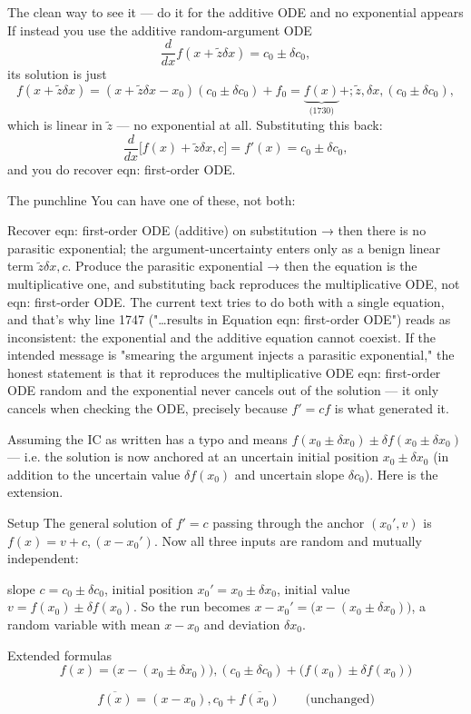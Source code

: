 \documentclass[twoside]{article}
\numberwithin{equation}{section}
\begin{document}
The clean way to see it — do it for the additive ODE and no exponential appears
If instead you use the additive random-argument ODE
$$\frac{d}{dx}f(x+\tilde z\delta x)=c_0\pm\delta c_0,$$
its solution is just
$$f(x+\tilde z\delta x)=(x+\tilde z\delta x-x_0)(c_0\pm\delta c_0)+f_0=\underbrace{f(x)}_{\text{(1730)}}+;\tilde z,\delta x,(c_0\pm\delta c_0),$$
which is linear in $\tilde z$ — no exponential at all. Substituting this back:
$$\frac{d}{dx}\big[f(x)+\tilde z\delta x,c\big]=f'(x)=c_0\pm\delta c_0,$$
and you do recover eqn: first-order ODE.

The punchline
You can have one of these, not both:

Recover eqn: first-order ODE (additive) on substitution → then there is no parasitic exponential; the argument-uncertainty enters only as a benign linear term $\tilde z\delta x,c$.
Produce the parasitic exponential → then the equation is the multiplicative one, and substituting back reproduces the multiplicative ODE, not eqn: first-order ODE.
The current text tries to do both with a single equation, and that's why line 1747 ("…results in Equation eqn: first-order ODE") reads as inconsistent: the exponential and the additive equation cannot coexist. If the intended message is "smearing the argument injects a parasitic exponential," the honest statement is that it reproduces the multiplicative ODE eqn: first-order ODE random and the exponential never cancels out of the solution — it only cancels when checking the ODE, precisely because $f'=cf$ is what generated it.


Assuming the IC as written has a typo and means $f(x_0\pm\delta x_0)\pm\delta f(x_0\pm\delta x_0)$ — i.e. the solution is now anchored at an uncertain initial position $x_0\pm\delta x_0$ (in addition to the uncertain value $\delta f(x_0)$ and uncertain slope $\delta c_0$). Here is the extension.

Setup
The general solution of $f'=c$ passing through the anchor $(x_0',v)$ is $f(x)=v+c,(x-x_0')$. Now all three inputs are random and mutually independent:

slope $c=c_0\pm\delta c_0$,
initial position $x_0'=x_0\pm\delta x_0$,
initial value $v=f(x_0)\pm\delta f(x_0)$.
So the run becomes $x-x_0'=\big(x-(x_0\pm\delta x_0)\big)$, a random variable with mean $x-x_0$ and deviation $\delta x_0$.

Extended formulas
$$f(x) = \big(x-(x_0\pm\delta x_0)\big),(c_0\pm\delta c_0) + \big(f(x_0)\pm\delta f(x_0)\big)$$

$$\overline{f(x)} = (x-x_0),c_0 + \overline{f(x_0)}\qquad\text{(unchanged)}$$
\end{document}
